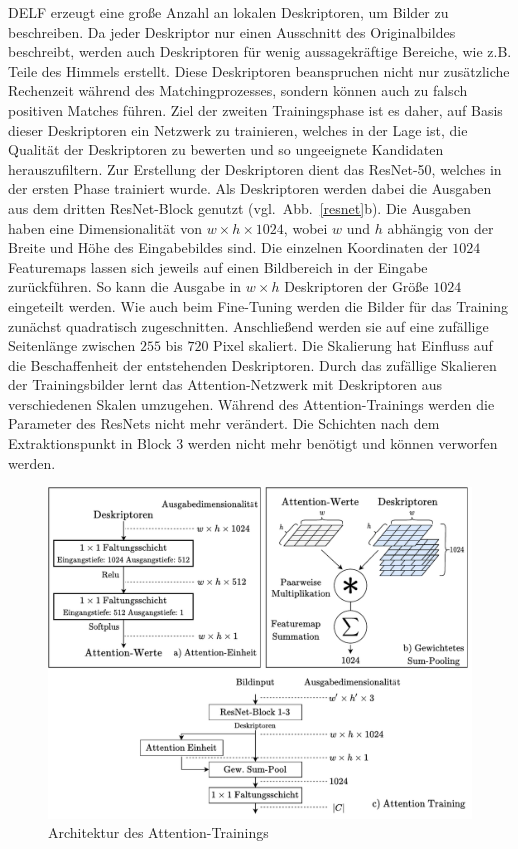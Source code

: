 DELF erzeugt eine große Anzahl an lokalen Deskriptoren, um Bilder zu beschreiben. Da jeder Deskriptor nur einen Ausschnitt des Originalbildes beschreibt, werden auch Deskriptoren für wenig aussagekräftige Bereiche, wie z.B. Teile des Himmels erstellt. Diese Deskriptoren beanspruchen nicht nur zusätzliche Rechenzeit während des Matchingprozesses, sondern können auch zu falsch positiven Matches führen. Ziel der zweiten Trainingsphase ist es daher, auf Basis dieser Deskriptoren ein Netzwerk zu trainieren, welches in der Lage ist, die Qualität der Deskriptoren zu bewerten und so ungeeignete Kandidaten herauszufiltern. 
Zur Erstellung der Deskriptoren dient das ResNet-50, welches in der ersten Phase trainiert wurde. Als Deskriptoren werden dabei die Ausgaben aus dem dritten ResNet-Block genutzt (vgl.~Abb.~\ref{resnet}b). Die Ausgaben haben eine Dimensionalität von $w\times h\times 1024$, wobei $w$ und $h$ abhängig von der Breite und Höhe des Eingabebildes sind. Die einzelnen Koordinaten der $1024$ Featuremaps lassen sich jeweils auf einen Bildbereich in der Eingabe zurückführen. So kann die Ausgabe in $w \times h$ Deskriptoren der Größe $1024$ eingeteilt werden. Wie auch beim Fine-Tuning werden die Bilder für das Training zunächst quadratisch zugeschnitten. Anschließend werden sie auf eine zufällige Seitenlänge zwischen $255$ bis $720$ Pixel skaliert. Die Skalierung hat Einfluss auf die Beschaffenheit der entstehenden Deskriptoren. Durch das zufällige Skalieren der Trainingsbilder lernt das Attention-Netzwerk mit Deskriptoren aus verschiedenen Skalen umzugehen. Während des Attention-Trainings werden die Parameter des ResNets nicht mehr verändert. Die Schichten nach dem Extraktionspunkt in Block 3 werden nicht mehr benötigt und können verworfen werden. \\
\begin{figure}[h]
\centering
\includegraphics[scale=0.77]{attention_spaced.pdf}
\caption{Architektur des Attention-Trainings}
\label{attention}
\end{figure}
